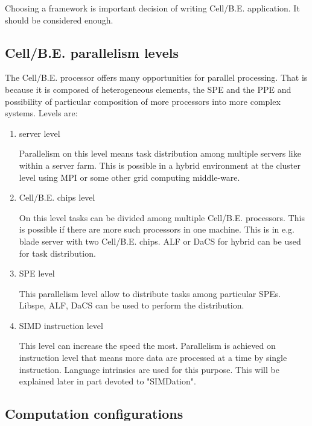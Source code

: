 Choosing a framework is important decision of writing \mbox{Cell/B.E.} application.
It should be considered enough.

\subsection {\mbox{Cell/B.E.} parallelism levels}

The \mbox{Cell/B.E.} processor offers many opportunities for parallel processing.
That is because it is composed of heterogeneous elements, the SPE and the PPE and possibility of particular composition of more processors into more complex systems.
 Levels are:
\begin{enumerate}
\item server level
\par
Parallelism on this level means task distribution among multiple servers like within a server farm.
This is possible in a hybrid environment at the cluster level using MPI or some other grid computing middle-ware.

\item \mbox{Cell/B.E.} chips level
\par
On this level tasks can be divided among multiple \mbox{Cell/B.E.} processors.
This is possible if there are more such processors in one machine.
This is in e.g. blade server with two \mbox{Cell/B.E.} chips.
ALF or DaCS for hybrid can be used for task distribution.

\item SPE level
\par
This parallelism level allow to distribute tasks among particular SPEs.
Libspe, ALF, DaCS can be used to perform the distribution.

\item SIMD instruction level
\par
This level can increase the speed the most.
Parallelism is achieved on instruction level that means more data are processed at a time by single instruction.
Language intrinsics are used for this purpose.
This will be explained later in part devoted to "SIMDation".
\end{enumerate}

\subsection{Computation configurations}

